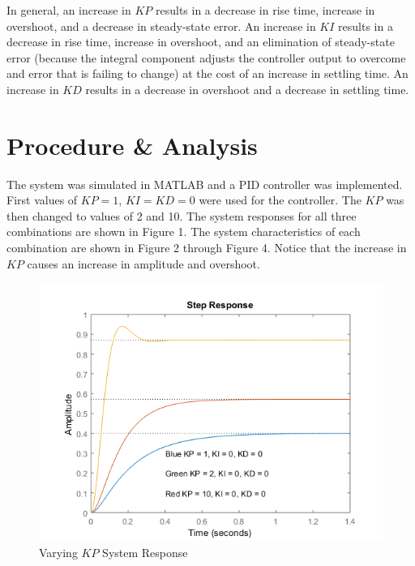 \documentclass[12pt]{article}
\begin{document}
In general, an increase in $KP$ results in a decrease in rise time, increase in overshoot, and a decrease in steady-state error. An increase in $KI$ results in a decrease in rise time, increase in overshoot, and an elimination of steady-state error (because the integral component adjusts the controller output to overcome and error that is failing to change) at the cost of an increase in settling time. An increase in $KD$ results in a decrease in overshoot and a decrease in settling time.



\section*{\fontsize{12}{12}\selectfont \large Procedure \& Analysis}
The system was simulated in MATLAB and a PID controller was implemented. First values of $KP=1$, $KI=KD=0$ were used for the controller. The $KP$ was then changed to values of 2 and 10. The system responses for all three combinations are shown in Figure 1. The system characteristics of each combination are shown in Figure 2 through Figure 4. Notice that the increase in $KP$ causes an increase in amplitude and overshoot.

\newpage

\begin{figure}[h!] %
   \centering
   \includegraphics[width=\linewidth]{part_1_response.png} 
   \caption{Varying $KP$ System Response}
   \label{fig:example}
\end{figure}
\end{document}
